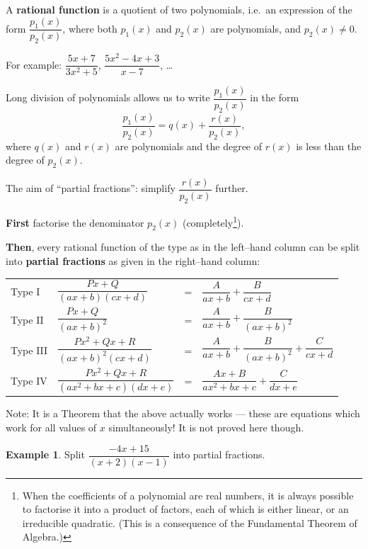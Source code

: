 \documentclass[
  12pt,
  oneside]{book}
\theoremstyle{definition}
\theoremstyle{definition}
\newtheorem{example}{Example}[chapter]
\theoremstyle{definition}
\theoremstyle{definition}
\theoremstyle{remark}
\begin{document}
A \textbf{rational function} is a quotient of two polynomials, i.e.~an expression of the form \(\dfrac{p_1(x)}{p_2(x)}\), where both \(p_1(x)\) and \(p_2(x)\) are polynomials, and \(p_2(x)\neq0\).

For example: \(\dfrac{5x+7}{3x^2+5}\), \(\dfrac{5x^2-4x+3}{x-7}\), \ldots{}

Long division of polynomials allows us to write \(\dfrac{p_1(x)}{p_2(x)}\) in the form
\[
\frac{p_1(x)}{p_2(x)} = q(x) + \frac{r(x)}{p_2(x)},
\]
where \(q(x)\) and \(r(x)\) are polynomials and the degree of \(r(x)\) is less than
the degree of \(p_2(x)\).

The aim of ``partial fractions'': simplify \(\dfrac{r(x)}{p_2(x)}\) further.

\textbf{First} factorise the denominator \(p_2(x)\) (completely\footnote{When the coefficients of a polynomial are real numbers, it is always possible to factorise it into a product of factors, each of which is either linear, or an irreducible quadratic. (This is a consequence of the Fundamental Theorem of Algebra.)}).

\textbf{Then}, every rational function of the type as in the left--hand column can be split
into \textbf{partial fractions} as given in the right--hand column:

\begin{longtable}[]{@{}
  >{\raggedright\arraybackslash}p{}
  >{\raggedleft\arraybackslash}p{}
  >{\raggedright\arraybackslash}p{}
  >{\raggedright\arraybackslash}p{}@{}}
\toprule
\endhead
Type I & \(\dfrac{Px+Q}{(ax+b)(cx+d)}\) & = & \(\dfrac{A}{ax+b}+\dfrac{B}{cx+d}\) \\
Type II & \(\dfrac{Px+Q}{(ax+b)^2}\) & = & \(\dfrac{A}{ax+b}+\dfrac{B}{(ax+b)^2}\) \\
Type III & \(\dfrac{Px^2+Qx+R}{(ax+b)^2(cx+d)}\) & = & \(\dfrac{A}{ax+b}+\dfrac{B}{(ax+b)^2}+\dfrac{C}{cx+d}\) \\
Type IV & \(\dfrac{Px^2+Qx+R}{(ax^2+bx+c)(dx+e)}\) & = & \(\dfrac{Ax+B}{ax^2+bx+c}+\dfrac{C}{dx+e}\) \\
\bottomrule
\end{longtable}

Note: It is a Theorem that the above actually works --- these are equations which work for all values of \(x\) simultaneously! It is not proved here though.

\begin{example}
Split \(\dfrac{-4x+15}{(x+2)(x-1)}\) into partial fractions.
\end{example}
\end{document}
